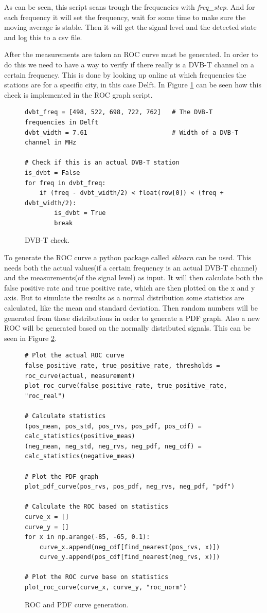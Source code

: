\documentclass[]{article}
\begin{document}
As can be seen, this script scans trough the frequencies with \textit{freq\_step}.
And for each frequency it will set the frequency, wait for some time to make sure the moving average is stable.
Then it will get the signal level and the detected state and log this to a csv file.

After the measurements are taken an ROC curve must be generated.
In order to do this we need to have a way to verify if there really is a DVB-T channel on a certain frequency.
This is done by looking up online at which frequencies the stations are for a specific city, in this case Delft.
In Figure \ref{fig:dvbt_check} can be seen how this check is implemented in the ROC graph script.

\begin{figure}[H]
\begin{lstlisting}[frame=bt]
dvbt_freq = [498, 522, 698, 722, 762]  	# The DVB-T frequencies in Delft
dvbt_width = 7.61                       # Width of a DVB-T channel in MHz

# Check if this is an actual DVB-T station
is_dvbt = False
for freq in dvbt_freq:
	if (freq - dvbt_width/2) < float(row[0]) < (freq + dvbt_width/2):
		is_dvbt = True
		break
\end{lstlisting}
\caption{DVB-T check.\label{fig:dvbt_check}}
\end{figure}

To generate the ROC curve a python package called \textit{sklearn} can be used.
This needs both the actual values(if a certain frequency is an actual DVB-T channel) and the measurements(of the signal level) as input.
It will then calculate both the false positive rate and true positive rate, which are then plotted on the x and y axis.
But to simulate the results as a normal distribution some statistics are calculated, like the mean and standard deviation.
Then random numbers will be generated from these distributions in order to generate a PDF graph.
Also a new ROC will be generated based on the normally distributed signals.
This can be seen in Figure \ref{fig:roc_gen}.

\begin{figure}[H]
\begin{lstlisting}[frame=bt]
# Plot the actual ROC curve
false_positive_rate, true_positive_rate, thresholds = roc_curve(actual, measurement)
plot_roc_curve(false_positive_rate, true_positive_rate, "roc_real")
	
# Calculate statistics
(pos_mean, pos_std, pos_rvs, pos_pdf, pos_cdf) = calc_statistics(positive_meas)
(neg_mean, neg_std, neg_rvs, neg_pdf, neg_cdf) = calc_statistics(negative_meas)

# Plot the PDF graph
plot_pdf_curve(pos_rvs, pos_pdf, neg_rvs, neg_pdf, "pdf")

# Calculate the ROC based on statistics
curve_x = []
curve_y = []
for x in np.arange(-85, -65, 0.1):
	curve_x.append(neg_cdf[find_nearest(pos_rvs, x)])
	curve_y.append(pos_cdf[find_nearest(neg_rvs, x)])

# Plot the ROC curve base on statistics
plot_roc_curve(curve_x, curve_y, "roc_norm")
\end{lstlisting}
\caption{ROC and PDF curve generation.\label{fig:roc_gen}}
\end{figure}
\end{document}
